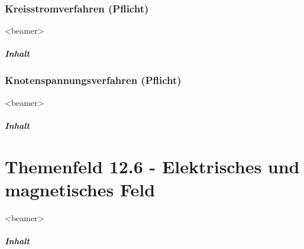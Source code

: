 \documentclass[aspectratio=169, ignorenonframetext]{beamer}
\begin{document}
\section[Kreisstrom]{Kreisstromverfahren (Pflicht)}
\begin{frame}<beamer>
  \frametitle{Inhalt}
\end{frame}


\section[Knotenspannung]{Knotenspannungsverfahren (Pflicht)}
\begin{frame}<beamer>
  \frametitle{Inhalt}
\end{frame}
%
%

\part{Themenfeld 12.6 - Elektrisches und magnetisches Feld}
\label{Teil_12_6}
\begin{frame}
  \partpage
\end{frame}

\begin{frame}
  \partpage
\end{frame}
\begin{frame}<beamer>
  \frametitle{Inhalt}

  \begin{columns}
    \tableofcontents[sections={7-12}]%
    \tableofcontents[sections={13-}]%
  \end{columns}

\end{frame}
\end{document}
